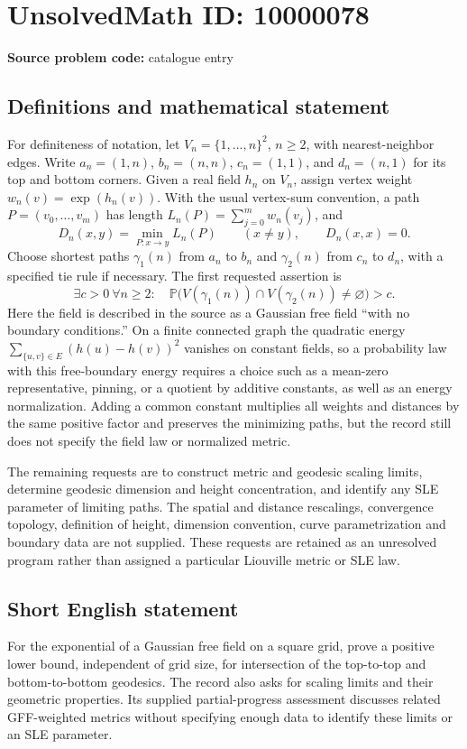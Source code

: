 \documentclass[11pt]{article}
\newcommand{\PP}{\mathbb{P}}
\begin{document}
\section*{UnsolvedMath ID: 10000078}
\textbf{Source problem code:} catalogue entry
\subsection{Definitions and mathematical statement}
For definiteness of notation, let \(V_n=\{1,\ldots,n\}^2\), \(n\ge2\), with nearest-neighbor edges. Write \(a_n=(1,n)\), \(b_n=(n,n)\), \(c_n=(1,1)\), and \(d_n=(n,1)\) for its top and bottom corners. Given a real field \(h_n\) on \(V_n\), assign vertex weight \(w_n(v)=\exp(h_n(v))\). With the usual vertex-sum convention, a path \(P=(v_0,\ldots,v_m)\) has length \(L_n(P)=\sum_{j=0}^{m}w_n(v_j)\), and
\[
 D_n(x,y)=\min_{P:x\to y}L_n(P)\qquad(x\ne y),\qquad D_n(x,x)=0.
\]
Choose shortest paths \(\gamma_1(n)\) from \(a_n\) to \(b_n\) and \(\gamma_2(n)\) from \(c_n\) to \(d_n\), with a specified tie rule if necessary. The first requested assertion is
\[
 \exists c>0\ \forall n\ge2:\quad
 \PP\bigl(V(\gamma_1(n))\cap V(\gamma_2(n))\ne\varnothing\bigr)>c.
\]
Here the field is described in the source as a Gaussian free field ``with no boundary conditions.'' On a finite connected graph the quadratic energy \(\sum_{\{u,v\}\in E}(h(u)-h(v))^2\) vanishes on constant fields, so a probability law with this free-boundary energy requires a choice such as a mean-zero representative, pinning, or a quotient by additive constants, as well as an energy normalization. Adding a common constant multiplies all weights and distances by the same positive factor and preserves the minimizing paths, but the record still does not specify the field law or normalized metric.

The remaining requests are to construct metric and geodesic scaling limits, determine geodesic dimension and height concentration, and identify any SLE parameter of limiting paths. The spatial and distance rescalings, convergence topology, definition of height, dimension convention, curve parametrization and boundary data are not supplied. These requests are retained as an unresolved program rather than assigned a particular Liouville metric or SLE law.
\subsection{Short English statement}
For the exponential of a Gaussian free field on a square grid, prove a positive lower bound, independent of grid size, for intersection of the top-to-top and bottom-to-bottom geodesics. The record also asks for scaling limits and their geometric properties. Its supplied partial-progress assessment discusses related GFF-weighted metrics without specifying enough data to identify these limits or an SLE parameter.
\end{document}
